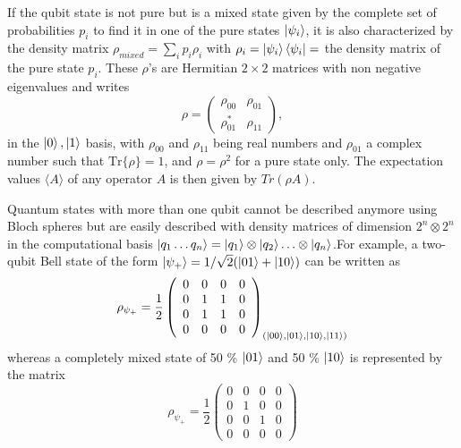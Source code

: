 \smallskip
If the qubit state is not pure but is a mixed state given by the complete set of probabilities ${p_{i}}$ to find it in one of the pure states  ${\left| \psi_{i} \right>}$, it is also characterized by the density matrix $\rho_{mixed} = \sum\limits_i p_i \rho_i$ with $\rho_i=\left| \psi_{i} \right>\left< \psi_{i} \right|=$ the density matrix of the pure state ${p_{i}}$. These $\rho$'s are Hermitian $2\times 2$ matrices with non negative eigenvalues and writes
%
\begin{equation}
\rho = \left( \begin{array}{cc} \rho_{00} & \rho_{01} \\ \rho_{01}^* & \rho_{11} \end{array} \right),
\end{equation}
%
in the ${\left| 0 \right>,\left| 1 \right>}$ basis, with $\rho_{00}$ and $\rho_{11}$ being real numbers and $\rho_{01}$ a complex number such that $\mathrm{Tr}\{\rho\}=1$, and $\rho=\rho^2$ for a pure state only. The expectation values $\langle A \rangle$ of any operator $A$ is then given by $Tr(\rho A)$.

\smallskip

Quantum states with more than one qubit cannot be described anymore using Bloch spheres but are easily described with density matrices of dimension $2^n\otimes 2^n$ in the computational basis $\left| q_1\hdots q_n \right>=\left| q_1 \right>\otimes\left| q_{2} \right>\hdots\otimes\left| q_n \right>$.For example, a two-qubit Bell state of the form $\left| \psi_+ \right>=1/\sqrt{2}(\left| 01 \right>+\left| 10 \right>)$ can be written as
%
\begin{equation}
\rho_{\psi_+} = \frac{1}{2}\left( \begin{array}{cccc} 0 & 0 & 0 & 0 \\ 0 & 1 & 1 & 0 \\ 0 & 1 & 1 & 0 \\ 0 & 0 & 0 & 0 \end{array} \right)_{(\left| 00 \right>,\left| 01 \right>,\left| 10 \right>,\left| 11 \right>)}
\end{equation}
%
whereas a completely mixed state of 50 \% $\left| 01 \right>$ and 50 \% $\left| 10 \right>$ is represented by the matrix
%
\begin{equation}
\rho_{\psi_+} = \frac{1}{2}\left( \begin{array}{cccc} 0 & 0 & 0 & 0 \\ 0 & 1 & 0 & 0 \\ 0 & 0 & 1 & 0 \\ 0 & 0 & 0 & 0 \end{array} \right)
\end{equation}
%

